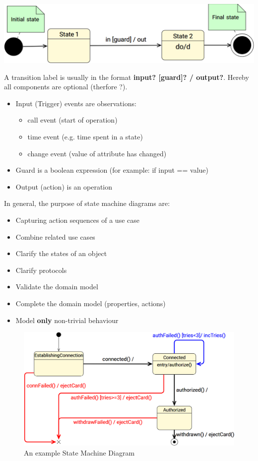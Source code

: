 \documentclass[
../../Software_Engineering_Summary.tex,
]
{subfiles}
\begin{document}
\begin{defbox}
    [Transitions]
    \begin{center}
        \includegraphics[scale=0.4]{Pics/04/BehaviourTransitions.png}
    \end{center}
    A transition label is usually in the format \textbf{input? [guard]? / output?}. Hereby all components are optional (therfore ?).
    \begin{itemize}
        \item Input (Trigger) events are observations:
        \begin{itemize}
            \item call event (start of operation)
            \item time event (e.g. time spent in a state)
            \item change event (value of attribute has changed)
        \end{itemize}
        \item Guard is a boolean expression (for example: if input == value)
        \item Output (action) is an operation
    \end{itemize}
\end{defbox}

In general, the purpose of state machine diagrams are:
\begin{itemize}
    \item Capturing action sequences of a use case
    \item Combine related use cases
    \item Clarify the states of an object
    \item Clarify protocols
    \item Validate the domain model
    \item Complete the domain model (properties, actions)
    \item Model \textbf{only} non-trivial behaviour
\end{itemize}

\begin{figure}
    [htp]
    \centering
    \includegraphics[scale=0.5]{Pics/04/StateMachineDiagramExample.png}
    \caption{An example State Machine Diagram}
\end{figure}
\end{document}
